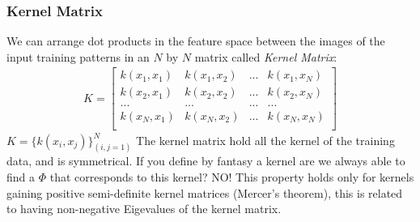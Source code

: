 \documentclass[12pt]{book}
\begin{document}
\subsubsection{Kernel Matrix}
We can arrange dot products in the feature space between the images of the input training patterns in an $N$ by $N$ matrix called \textit{Kernel Matrix}:
\begin{equation}
	\begin{aligned}
		K = \begin{bmatrix}
			k(x_1, x_1) & k(x_1, x_2) & ... & k(x_1, x_N)\\
			k(x_2, x_1) & k(x_2, x_2) & ... & k(x_2, x_N)\\
			... & ... & ... & ...\\
			k(x_N, x_1) & k(x_N, x_2) & ... & k(x_N, x_N)\\
		\end{bmatrix}
	\end{aligned}
\end{equation}
$K = \{k(x_i, x_j)\}^{N}_{(i,j=1)}$\newline
The kernel matrix hold all the kernel of the training data, and is symmetrical.\newline
If you define by fantasy a kernel are we always able to find a $\Phi$ that corresponds to this kernel? NO!\newline
This property holds only for kernels gaining positive semi-definite kernel matrices (Mercer's theorem), this is related to having non-negative Eigevalues of the kernel matrix.
\end{document}
